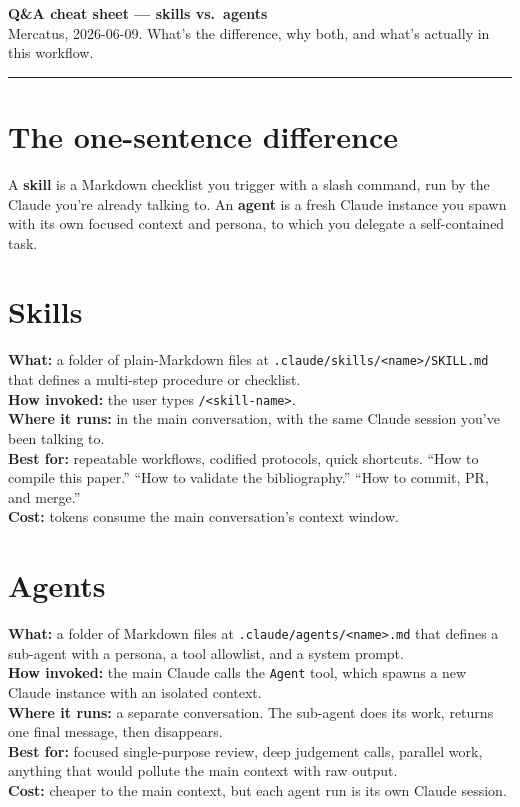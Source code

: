 \documentclass[10pt]{article}
\begin{document}
\begin{center}
{\Large\bfseries Q\&A cheat sheet --- skills vs.\ agents}\\
\smallskip
{\footnotesize Mercatus, 2026-06-09. \quad What's the difference, why both, and what's actually in this workflow.}
\end{center}

\hrule
\vspace{0.5em}

\section*{The one-sentence difference}

A \textbf{skill} is a Markdown checklist you trigger with a slash command, run by the Claude you're already talking to. An \textbf{agent} is a fresh Claude instance you spawn with its own focused context and persona, to which you delegate a self-contained task.

\section*{Skills}

\textbf{What:} a folder of plain-Markdown files at \texttt{.claude/skills/<name>/SKILL.md} that defines a multi-step procedure or checklist.\\
\textbf{How invoked:} the user types \texttt{/<skill-name>}.\\
\textbf{Where it runs:} in the main conversation, with the same Claude session you've been talking to.\\
\textbf{Best for:} repeatable workflows, codified protocols, quick shortcuts. ``How to compile this paper.'' ``How to validate the bibliography.'' ``How to commit, PR, and merge.''\\
\textbf{Cost:} tokens consume the main conversation's context window.

\section*{Agents}

\textbf{What:} a folder of Markdown files at \texttt{.claude/agents/<name>.md} that defines a sub-agent with a persona, a tool allowlist, and a system prompt.\\
\textbf{How invoked:} the main Claude calls the \texttt{Agent} tool, which spawns a new Claude instance with an isolated context.\\
\textbf{Where it runs:} a separate conversation. The sub-agent does its work, returns one final message, then disappears.\\
\textbf{Best for:} focused single-purpose review, deep judgement calls, parallel work, anything that would pollute the main context with raw output.\\
\textbf{Cost:} cheaper to the main context, but each agent run is its own Claude session.
\end{document}
